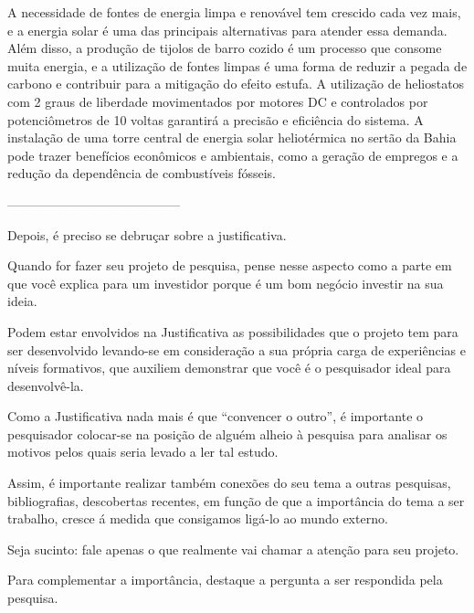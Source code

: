 
A necessidade de fontes de energia limpa e renovável tem crescido cada vez mais, e a energia solar é uma das principais alternativas para atender essa demanda. Além disso, a produção de tijolos de barro cozido é um processo que consome muita energia, e a utilização de fontes limpas é uma forma de reduzir a pegada de carbono e contribuir para a mitigação do efeito estufa. A utilização de heliostatos com 2 graus de liberdade movimentados por motores DC e controlados por potenciômetros de 10 voltas garantirá a precisão e eficiência do sistema. A instalação de uma torre central de energia solar heliotérmica no sertão da Bahia pode trazer benefícios econômicos e ambientais, como a geração de empregos e a redução da dependência de combustíveis fósseis.

-----------------------------------------


Depois, é preciso se debruçar sobre a justificativa.

Quando for fazer seu projeto de pesquisa, pense nesse aspecto como a parte em que você explica para um investidor porque é um bom negócio investir na sua ideia.

Podem estar envolvidos na Justificativa as possibilidades que o projeto tem para ser desenvolvido levando-se em consideração a sua própria carga de experiências e níveis formativos, que auxiliem demonstrar que você é o pesquisador ideal para desenvolvê-la.

Como a Justificativa nada mais é que “convencer o outro”, é importante o pesquisador colocar-se na posição de alguém alheio à pesquisa para analisar os motivos pelos quais seria levado a ler tal estudo.

Assim, é importante realizar também conexões do seu tema a outras pesquisas, bibliografias, descobertas recentes, em função de que a importância do tema a ser trabalho, cresce á medida que consigamos ligá-lo ao mundo externo.

Seja sucinto: fale apenas o que realmente vai chamar a atenção para seu projeto.

Para complementar a importância, destaque a pergunta a ser respondida pela pesquisa.

